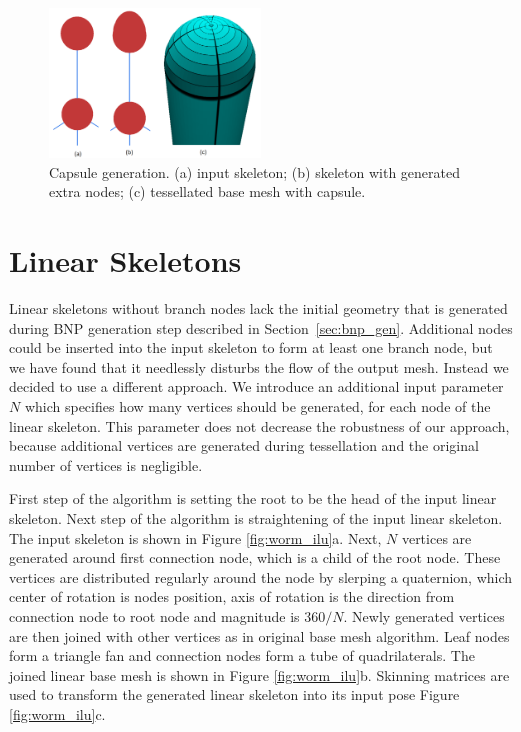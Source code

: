 \begin{figure}[ht]
    \centering
    \includegraphics[width=0.5\textwidth]{images/capsule_process}
    \caption[Capsule generation]{Capsule generation. (a) input skeleton; (b) skeleton with generated extra nodes; (c) tessellated base mesh with capsule.}
    \label{fig:capsule_ilu}
\end{figure}

\section{Linear Skeletons}
Linear skeletons without branch nodes lack the initial geometry that is generated during BNP generation step described in Section~\ref{sec:bnp_gen}.
Additional nodes could be inserted into the input skeleton to form at least one branch node, but we have found that it needlessly disturbs the flow of the output mesh.
Instead we decided to use a different approach.
We introduce an additional input parameter $N$ which specifies how many vertices should be generated, for each node of the linear skeleton.
This parameter does not decrease the robustness of our approach, because additional vertices are generated during tessellation and the original number of vertices is negligible.

First step of the algorithm is setting the root to be the head of the input linear skeleton.
Next step of the algorithm is straightening of the input linear skeleton.
The input skeleton is shown in Figure \ref{fig:worm_ilu}a.
Next, $N$ vertices are generated around first connection node, which is a child of the root node.
These vertices are distributed regularly around the node by slerping a quaternion, which center of rotation is nodes position, axis of rotation is the direction from connection node to root node and magnitude is $360/N$.
Newly generated vertices are then joined with other vertices as in original base mesh algorithm.
Leaf nodes form a triangle fan and connection nodes form a tube of quadrilaterals.
The joined linear base mesh is shown in Figure \ref{fig:worm_ilu}b.
Skinning matrices are used to transform the generated linear skeleton into its input pose Figure \ref{fig:worm_ilu}c.

